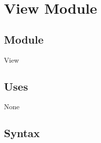 \documentclass[12pt]{article}
\begin{document}




\newpage

\section* {View Module}

\subsection*{Module}

View

\subsection* {Uses}

None

\subsection* {Syntax}
\end{document}
